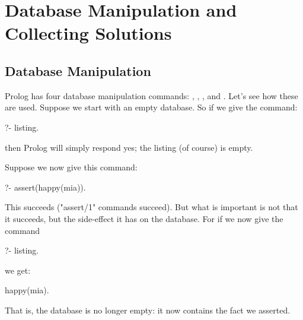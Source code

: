 

\chapter{Database Manipulation and Collecting Solutions}\label{CHAPTER11}




\section{Database Manipulation}\label{SEC.L11.DATABASE.MANIP}

Prolog has four database manipulation commands:
,
,
, and
.
Let's see how these are used.  Suppose we start with an empty database.  So if
we give the command:
\begin{LPNcodedisplay}
?- listing.
\end{LPNcodedisplay}
then Prolog will simply respond yes; the listing (of course) is empty.

Suppose we now give this command:
\begin{LPNcodedisplay}
?- assert(happy(mia)).
\end{LPNcodedisplay}

This succeeds ("assert/1" commands  succeed).  But
what is important is not that it succeeds, but the side-effect it has
on the database.  For if we now give the command
\begin{LPNcodedisplay}
?- listing.
\end{LPNcodedisplay}
we get:
\begin{LPNcodedisplay}
happy(mia).
\end{LPNcodedisplay}
That is, the database is no longer empty: it now contains the fact we
asserted.

